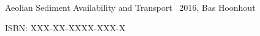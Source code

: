 \thispagestyle{empty}

\hfill

\vfill

\noindent Aeolian Sediment Availability and Transport \textcopyright\ 2016, Bas Hoonhout



\bigskip

\noindent ISBN: XXX-XX-XXXX-XXX-X

